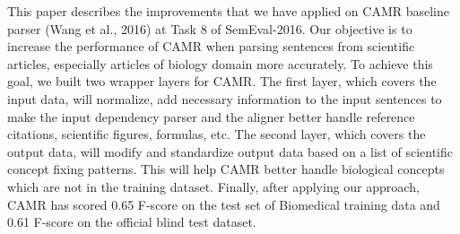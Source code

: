 This paper describes the improvements that we have applied on CAMR baseline parser (Wang et al., 2016) at Task 8 of SemEval-2016. Our objective is to increase the performance of CAMR when parsing sentences from scientific articles, especially articles of biology domain more accurately. To achieve this goal, we built two wrapper layers for CAMR. The first layer, which covers the input data, will normalize, add necessary information to the input sentences to make the input dependency parser and the aligner better handle reference citations, scientific figures, formulas, etc. The second layer, which covers the output data, will modify and standardize output data based on a list of scientific concept fixing patterns. This will help CAMR better handle biological concepts which are not in the training dataset. Finally, after applying our approach, CAMR has scored 0.65 F-score on the test set of Biomedical training data and 0.61 F-score on the official blind test dataset.

